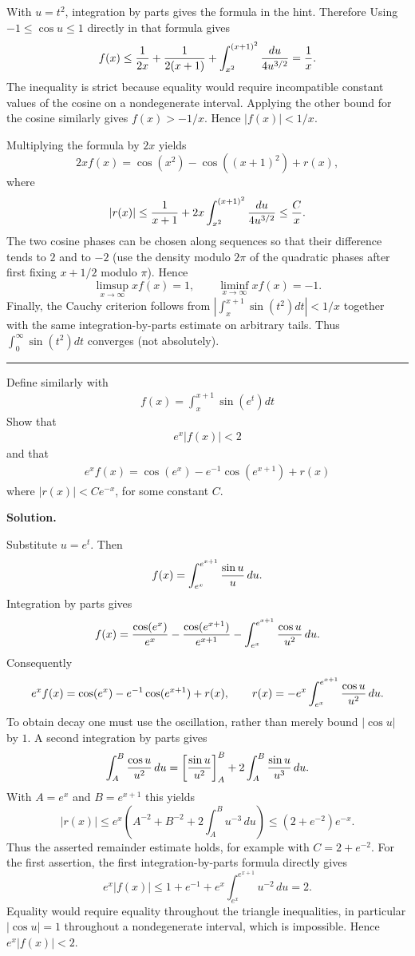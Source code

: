 \documentclass[12pt]{article}
\theoremstyle{definition}
\begin{document}
With $u=t^2$, integration by parts gives the formula in the hint.  Therefore
Using $-1\le\cos u\le1$ directly in that formula gives
\[
 f(x)\le {1\over2x}+{1\over2(x+1)}
 +\int_{x^2}^{(x+1)^2}{du\over4u^{3/2}}={1\over x}.
\]
The inequality is strict because equality would require incompatible constant values of the cosine on a nondegenerate interval.  Applying the other bound for the cosine similarly gives $f(x)>-1/x$.  Hence $|f(x)|<1/x$.

Multiplying the formula by $2x$ yields
\[
 2xf(x)=\cos(x^2)-\cos((x+1)^2)+r(x),
\]
where
\[
 |r(x)|\le {1\over x+1}+2x\int_{x^2}^{(x+1)^2}{du\over4u^{3/2}}\le {C\over x}.
\]
The two cosine phases can be chosen along sequences so that their difference tends to $2$ and to $-2$ (use the density modulo $2\pi$ of the quadratic phases after first fixing $x+1/2$ modulo $\pi$).  Hence
\[
 \limsup_{x\to\infty}xf(x)=1,\qquad \liminf_{x\to\infty}xf(x)=-1.
\]
Finally, the Cauchy criterion follows from $|\int_x^{x+1}\sin(t^2)dt|<1/x$ together with the same integration-by-parts estimate on arbitrary tails.  Thus $\int_0^\infty\sin(t^2)dt$ converges (not absolutely).




\bigskip\noindent\hrule\bigskip

Define similarly with
\begin{align*}
f(x)=\int_x^{x+1}\sin\left(e^t\right)dt
\end{align*}
Show that
\begin{align*}
e^x\left\vert f(x)\right\vert<2
\end{align*}
and that
\begin{align*}
e^xf(x)=\cos\left(e^x\right)-e^{-1}\cos\left(e^{x+1}\right)+r(x)
\end{align*}
where $\left\vert r(x)\right\vert<Ce^{-x}$, for some constant $C$.

\smallskip
\noindent\textbf{Solution.}\quad


Substitute $u=e^t$.  Then
\[
 f(x)=\int_{e^x}^{e^{x+1}}{\sin u\over u}\,du.
\]
Integration by parts gives
\[
 f(x)={\cos(e^x)\over e^x}-{\cos(e^{x+1})\over e^{x+1}}
       -\int_{e^x}^{e^{x+1}}{\cos u\over u^2}\,du.
\]
Consequently
\[
 e^xf(x)=\cos(e^x)-e^{-1}\cos(e^{x+1})+r(x),\qquad
 r(x)=-e^x\int_{e^x}^{e^{x+1}}{\cos u\over u^2}\,du.
\]
To obtain decay one must use the oscillation, rather than merely bound
$|\cos u|$ by $1$.  A second integration by parts gives
\[
 \int_A^B{\cos u\over u^2}\,du
 =\left[{\sin u\over u^2}\right]_A^B
   +2\int_A^B{\sin u\over u^3}\,du.
\]
With $A=e^x$ and $B=e^{x+1}$ this yields
\[
 |r(x)|\le e^x\left(A^{-2}+B^{-2}
       +2\int_A^B u^{-3}\,du\right)
 \le (2+e^{-2})e^{-x}.
\]
Thus the asserted remainder estimate holds, for example with
$C=2+e^{-2}$.  For the first assertion, the first integration-by-parts
formula directly gives
\[
 e^x|f(x)|
 \le 1+e^{-1}+e^x\int_{e^x}^{e^{x+1}}u^{-2}\,du=2.
\]
Equality would require equality throughout the triangle inequalities,
in particular $|\cos u|=1$ throughout a nondegenerate interval, which
is impossible.  Hence $e^x|f(x)|<2$.
\end{document}
